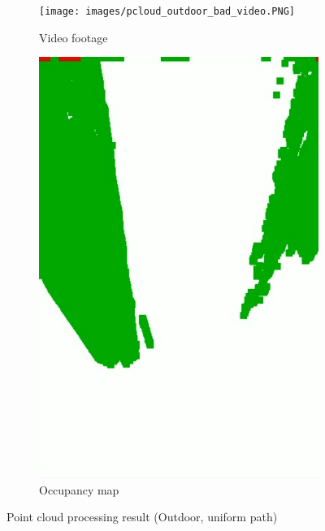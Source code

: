 \begin{figure}[p]
    \centering
    \begin{subfigure}{.6\textwidth}
        \centering
        \texttt{[image: images/pcloud\_outdoor\_bad\_video.PNG]}
        \caption{Video footage}
    \end{subfigure}
    \quad
    \begin{subfigure}{.3\textwidth}
        \centering
        \includegraphics[width=\linewidth,frame]{images/pcloud_outdoor_bad.PNG}
        \caption{Occupancy map}
    \end{subfigure}
    \caption{Point cloud processing result (Outdoor, uniform path)}
    \label{fig:pcloud_outdoor_bad}
\end{figure}\clearpage

